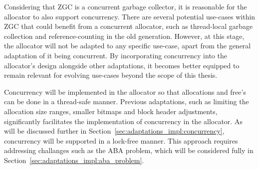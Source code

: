 Considering that ZGC is a concurrent garbage collector, it is reasonable for the allocator to also support concurrency. There are several potential use-cases within ZGC that could benefit from a concurrent allocator, such as thread-local garbage collection and reference-counting in the old generation. However, at this stage, the allocator will not be adapted to any specific use-case, apart from the general adaptation of it being concurrent. By incorporating concurrency into the allocator's design alongside other adaptations, it becomes better equipped to remain relevant for evolving use-cases beyond the scope of this thesis.

Concurrency will be implemented in the allocator so that allocations and free's can be done in a thread-safe manner. Previous adaptations, such as limiting the allocation size ranges, smaller bitmaps and block header adjustments, significantly facilitates the implementation of concurrency in the allocator. As will be discussed further in Section~\ref{sec:adaptations_impl:concurrency}, concurrency will be supported in a lock-free manner. This approach requires addressing challanges such as the ABA problem, which will be considered fully in Section~\ref{sec:adaptations_impl:aba_problem}.

